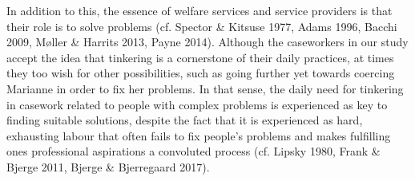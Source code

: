 \par
In addition to this, the essence of welfare services and service providers is that their role is to solve problems (cf. Spector \& Kitsuse 1977, Adams 1996, Bacchi 2009, Møller \& Harrits 2013, Payne 2014). Although the caseworkers in our study accept the idea that tinkering is a cornerstone of their daily practices, at times they too wish for other possibilities, such as going further yet towards coercing Marianne in order to fix her problems. In that sense, the daily need for tinkering in casework related to people with complex problems is experienced as key to finding suitable solutions, despite the fact that it is experienced as hard, exhausting labour that often fails to fix people’s problems and makes fulfilling ones professional aspirations a convoluted process (cf. Lipsky 1980, Frank \& Bjerge 2011, Bjerge \& Bjerregaard 2017).